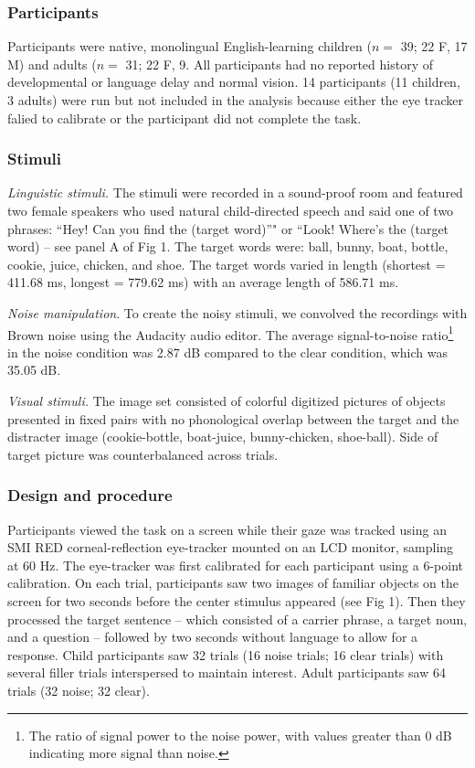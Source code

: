 \documentclass[10pt, letterpaper]{article}
\begin{document}
\subsubsection{Participants}\label{participants}

Participants were native, monolingual English-learning children (\(n=\)
39; 22 F, 17 M) and adults (\(n=\) 31; 22 F, 9. All participants had no
reported history of developmental or language delay and normal vision.
14 participants (11 children, 3 adults) were run but not included in the
analysis because either the eye tracker falied to calibrate or the
participant did not complete the task.

\subsubsection{Stimuli}\label{stimuli}

\emph{Linguistic stimuli.} The stimuli were recorded in a sound-proof
room and featured two female speakers who used natural child-directed
speech and said one of two phrases: ``Hey! Can you find the (target
word)''" or ``Look! Where's the (target word) -- see panel A of Fig 1.
The target words were: ball, bunny, boat, bottle, cookie, juice,
chicken, and shoe. The target words varied in length (shortest = 411.68
ms, longest = 779.62 ms) with an average length of 586.71 ms.

\emph{Noise manipulation}. To create the noisy stimuli, we convolved the
recordings with Brown noise using the Audacity audio editor. The average
signal-to-noise ratio\footnote{The ratio of signal power to the noise
  power, with values greater than 0 dB indicating more signal than
  noise.} in the noise condition was 2.87 dB compared to the clear
condition, which was 35.05 dB.

\emph{Visual stimuli.} The image set consisted of colorful digitized
pictures of objects presented in fixed pairs with no phonological
overlap between the target and the distracter image (cookie-bottle,
boat-juice, bunny-chicken, shoe-ball). Side of target picture was
counterbalanced across trials.

\subsubsection{Design and procedure}\label{design-and-procedure}

Participants viewed the task on a screen while their gaze was tracked
using an SMI RED corneal-reflection eye-tracker mounted on an LCD
monitor, sampling at 60 Hz. The eye-tracker was first calibrated for
each participant using a 6-point calibration. On each trial,
participants saw two images of familiar objects on the screen for two
seconds before the center stimulus appeared (see Fig 1). Then they
processed the target sentence -- which consisted of a carrier phrase, a
target noun, and a question -- followed by two seconds without language
to allow for a response. Child participants saw 32 trials (16 noise
trials; 16 clear trials) with several filler trials interspersed to
maintain interest. Adult participants saw 64 trials (32 noise; 32
clear).
\end{document}
